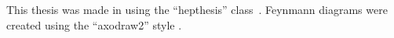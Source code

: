 \begin{colophon}
  This thesis was made in \LaTeXe{} using the ``hepthesis'' class~\cite{RN766}. Feynmann diagrams were created using the ``axodraw2'' style \cite{RN767}.
\end{colophon}




\listoffigures
\listoftables

